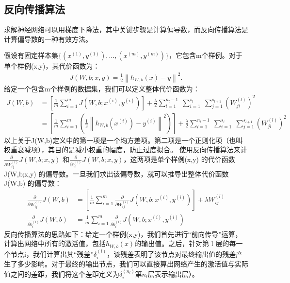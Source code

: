 \documentclass[UTF8]{ctexart}
\begin{document}
\subsection{反向传播算法}
求解神经网络可以用梯度下降法，其中关键步骤是计算偏导数，而反向传播算法是计算偏导数的一种有效方法。
\par 假设有固定样本集$\{ (x^{(1)}, y^{(1)}), \ldots, (x^{(m)}, y^{(m)}) \}$，它包含m个样例。对于单个样例(x,y)，其代价函数为：
\begin{align*} J(W,b; x,y) = \frac{1}{2} \left\| h_{W,b}(x) - y \right\|^2. \end{align*}
给定一个包含m个样例的数据集，我们可以定义整体代价函数为：
\begin{align*} 
	J(W,b) &= \left[ \frac{1}{m} \sum_{i=1}^m J(W,b;x^{(i)},y^{(i)}) \right] + \frac{\lambda}{2} \sum_{l=1}^{n_l-1} \; \sum_{i=1}^{s_l} \; \sum_{j=1}^{s_{l+1}} \left( W^{(l)}_{ji} \right)^2 \\ &= \left[ \frac{1}{m} \sum_{i=1}^m \left( \frac{1}{2} \left\| h_{W,b}(x^{(i)}) - y^{(i)} \right\|^2 \right) \right] + \frac{\lambda}{2} \sum_{l=1}^{n_l-1} \; \sum_{i=1}^{s_l} \; \sum_{j=1}^{s_{l+1}} \left( W^{(l)}_{ji} \right)^2
\end{align*} 
以上关于J(W,b)定义中的第一项是一个均方差项。第二项是一个正则化项（也叫权重衰减项），其目的是减小权重的幅度，防止过度拟合。
使用反向传播算法来计$\frac{\partial}{\partial W_{ij}^{(l)}} J(W,b; x, y)$ 和$\frac{\partial}{\partial b_{i}^{(l)}} J(W,b; x, y)$，这两项是单个样例(x,y) 的代价函数J(W,b;x,y) 的偏导数。一旦我们求出该偏导数，就可以推导出整体代价函数J(W,b) 的偏导数：
\begin{align*} 
	\frac{\partial}{\partial W_{ij}^{(l)}} J(W,b) &= \left[ \frac{1}{m} \sum_{i=1}^m \frac{\partial}{\partial W_{ij}^{(l)}} J(W,b; x^{(i)}, y^{(i)}) \right] + \lambda W_{ij}^{(l)} \\ \frac{\partial}{\partial b_{i}^{(l)}} J(W,b) &= \frac{1}{m}\sum_{i=1}^m \frac{\partial}{\partial b_{i}^{(l)}} J(W,b; x^{(i)}, y^{(i)}) 
\end{align*} 
反向传播算法的思路如下：给定一个样例(x,y)，我们首先进行“前向传导”运算，计算出网络中所有的激活值，包括$h_{W,b}(x)$的输出值。之后，针对第 l 层的每一个节点i，我们计算出其“残差”$\delta^{(l)}_i$，该残差表明了该节点对最终输出值的残差产生了多少影响。对于最终的输出节点，我们可以直接算出网络产生的激活值与实际值之间的差距，我们将这个差距定义为$\delta^{(n_l)}_i$第$n_l$层表示输出层）。
\end{document}
